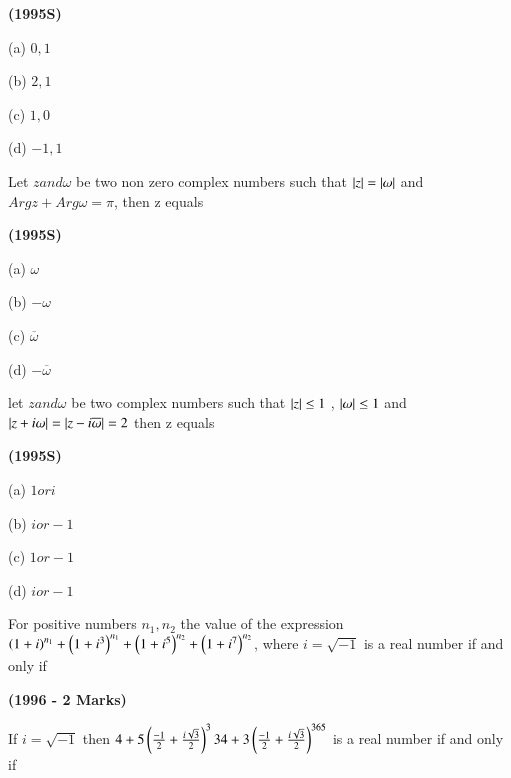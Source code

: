 \documentclass[journal,12pt,twocolumn]{IEEEtran}
\theoremstyle{remark}
\begin{document}
\hfill{\textbf{(1995S)}}

\begin{enumerate}
\begin{multicols}{4}
\item[(a)]$0,1$
\item[(b)]$2,1$
\item[(c)]$1,0$
\item[(d)]$-1,1$
\end{multicols}
\end{enumerate}
\item Let $z and \omega$ be two non zero complex numbers such that $\left\vert z\right\vert=\left\vert\omega\right\vert$ and $Argz+Arg\omega=\pi$, then z equals 

\hfill{\textbf{(1995S)}}

\begin{enumerate}
\begin{multicols}{4}
\item[(a)]$\omega$
\item[(b)]$-\omega$
\item[(c)]$\overline{\omega}$
\item[(d)]$-\overline{\omega}$
\end{multicols}
\end{enumerate}
\item let $z and \omega$ be two complex numbers such that $\left\vert z\right\vert\leq1$ , $\left\vert\omega\right\vert\leq1$ and $\left\vert z+i\omega\right\vert=\left\vert z-i\overline{\omega}\right\vert=2$ then z equals 

\hfill{\textbf{(1995S)}}

\begin{enumerate}
\begin{multicols}{4}
\item[(a)]$1 or i$
\item[(b)]$i or -1$
\item[(c)]$1 or -1$
\item[(d)]$i or -1$
\end{multicols}
\end{enumerate}
\item For positive numbers $n_1,n_2$ the value of the expression $\left(1+i\right)^{n_1}+\left(1+i^3\right)^{n_1}+\left(1+i^5\right)^{n_2}+\left(1+i^7\right)^{n_2}$, where $i=\sqrt{-1}$ is a real number if and only if

\hfill{\textbf{(1996 - 2 Marks)}}

\item If $i=\sqrt{-1}$ then $4+5\left(\frac{-1}{2}+\frac{i\sqrt{3}}{2}\right)^334 + 3\left(\frac{-1}{2}+\frac{i\sqrt{3}}{2}\right)^{365}$ is a real number if and only if 
\end{document}
